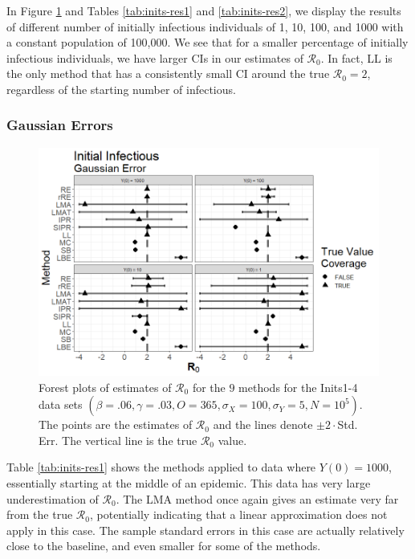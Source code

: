 \documentclass[12pt]{article}
\newcommand{\xxsir}{\ensuremath{9} } %
\newcommand{\rr}{\ensuremath{\mathcal{R}_0}}
\begin{document}
In Figure \ref{fig:inits-res} and Tables \ref{tab:inits-res1} and \ref{tab:inits-res2}, we display the results of different number of initially infectious individuals of 1, 10, 100, and 1000 with a constant population of 100,000.  We see that for a smaller percentage of initially infectious individuals, we have larger CIs in our estimates of $\rr$.  In fact, LL is the only method that has a consistently small CI around the true $\rr=2$, regardless of the starting number of infectious.

\subsubsection{Gaussian Errors}

\begin{figure}[H]
  \centering
  \includegraphics[scale=0.5]{images/start_n.tiff}
    \caption{Forest plots of estimates of $\rr$ for the \xxsir methods for the Inits1-4 data sets $(\beta=.06, \gamma=.03, O=365, \sigma_X=100, \sigma_Y=5, N=10^5)$.  The points are the estimates of $\rr$ and the lines denote $\pm 2\cdot $Std. Err.  The vertical line is the true $\rr$ value.}\label{fig:inits-res}
  \end{figure}

  Table \ref{tab:inits-res1} shows the methods applied to data where $Y(0) = 1000$, essentially starting at the middle of an epidemic. This data has very large underestimation of $\rr$. The LMA method once again gives an estimate very far from the true $\rr$, potentially indicating that a linear approximation does not apply in this case. The sample standard errors in this case are actually relatively close to the baseline, and even smaller for some of the methods.
\end{document}
